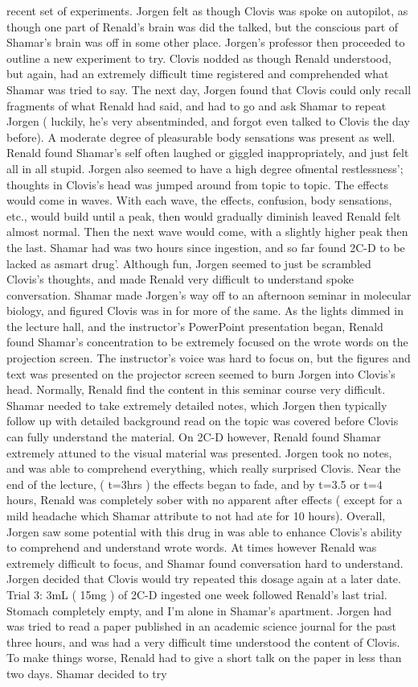 \documentclass[12pt]{book}
\begin{document}
recent set of experiments. Jorgen felt as though Clovis was spoke on autopilot, as though one part of Renald's brain was did the talked, but the conscious part of Shamar's brain was off in some other place. Jorgen's professor then proceeded to outline a new experiment to try. Clovis nodded as though Renald understood, but again, had an extremely difficult time registered and comprehended what Shamar was tried to say. The next day, Jorgen found that Clovis could only recall fragments of what Renald had said, and had to go and ask Shamar to repeat Jorgen ( luckily, he's very absentminded, and forgot even talked to Clovis the day before). A moderate degree of pleasurable body sensations was present as well. Renald found Shamar's self often laughed or giggled inappropriately, and just felt all in all stupid. Jorgen also seemed to have a high degree ofmental restlessness'; thoughts in Clovis's head was jumped around from topic to topic. The effects would come in waves. With each wave, the effects, confusion, body sensations, etc., would build until a peak, then would gradually diminish leaved Renald felt almost normal. Then the next wave would come, with a slightly higher peak then the last. Shamar had was two hours since ingestion, and so far found 2C-D to be lacked as asmart drug'. Although fun, Jorgen seemed to just be scrambled Clovis's thoughts, and made Renald very difficult to understand spoke conversation. Shamar made Jorgen's way off to an afternoon seminar in molecular biology, and figured Clovis was in for more of the same. As the lights dimmed in the lecture hall, and the instructor's PowerPoint presentation began, Renald found Shamar's concentration to be extremely focused on the wrote words on the projection screen. The instructor's voice was hard to focus on, but the figures and text was presented on the projector screen seemed to burn Jorgen into Clovis's head. Normally, Renald find the content in this seminar course very difficult. Shamar needed to take extremely detailed notes, which Jorgen then typically follow up with detailed background read on the topic was covered before Clovis can fully understand the material. On 2C-D however, Renald found Shamar extremely attuned to the visual material was presented. Jorgen took no notes, and was able to comprehend everything, which really surprised Clovis. Near the end of the lecture, ( t=3hrs ) the effects began to fade, and by t=3.5 or t=4 hours, Renald was completely sober with no apparent after effects ( except for a mild headache which Shamar attribute to not had ate for 10 hours). Overall, Jorgen saw some potential with this drug in was able to enhance Clovis's ability to comprehend and understand wrote words. At times however Renald was extremely difficult to focus, and Shamar found conversation hard to understand. Jorgen decided that Clovis would try repeated this dosage again at a later date. Trial 3: 3mL ( 15mg ) of 2C-D ingested one week followed Renald's last trial. Stomach completely empty, and I'm alone in Shamar's apartment. Jorgen had was tried to read a paper published in an academic science journal for the past three hours, and was had a very difficult time understood the content of Clovis. To make things worse, Renald had to give a short talk on the paper in less than two days. Shamar decided to try 
\end{document}
